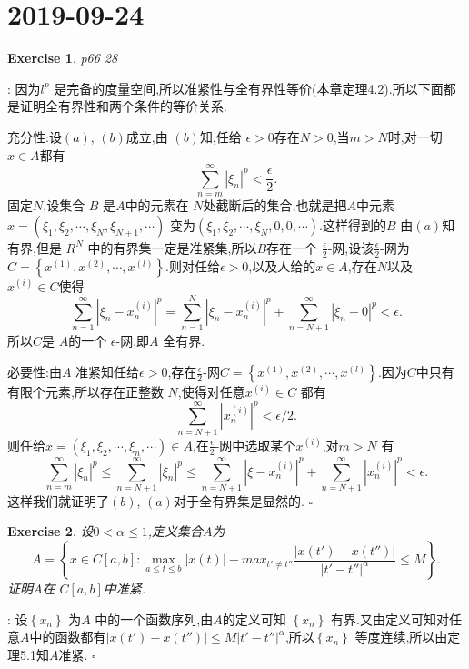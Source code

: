 \documentclass[a4paper]{article}
\newtheorem*{exe}{Exercise}
\newenvironment{sol}{{\noindent\bfseries Solution}:}{\hfill $\square$\par}
\begin{document}
\section{2019-09-24}
\begin{exe}
  p66 28	
\end{exe}
\begin{sol}
  因为$l^{p}$ 是完备的度量空间,所以准紧性与全有界性等价(本章定理4.2).所以下面都是证明全有界性和两个条件的等价关系.

  充分性:设$(a)$, $(b)$成立,由 $(b)$知,任给 $\epsilon >0$存在$N>0$,当$m>N$时,对一切 $x\in A$都有
  \[
    \sum_{n=m}^{\infty} \left| \xi_n \right|^{p} <\frac{\epsilon}{2} 
  .\]
  固定$N$,设集合 $B$ 是$A$中的元素在 $N$处截断后的集合,也就是把$A$中元素 $x=\left( \xi_1,\xi_2,\cdots,\xi_N,\xi_{N+1},\cdots \right) $ 变为$\left( \xi_1,\xi_2,\cdots,\xi_N,0,0,\cdots \right) $.这样得到的$B$ 由$(a)$知有界,但是 $R^{N}$ 中的有界集一定是准紧集,所以$B$存在一个 $\frac{\epsilon }{2}$-网,设该$\frac{\epsilon }{2}$-网为$C=\left\{ x^{(1)},x^{(2)},\cdots,x^{(l)} \right\} $.则对任给$\epsilon >0$,以及人给的$x\in A$,存在$N$以及 $x^{(i)}\in C$使得
  \[
  \sum_{n=1}^{\infty} \left| \xi_n-x^{(i)}_n \right| ^{p}=\sum_{n=1}^{N} \left| \xi_n-x^{(i)}_n \right| ^{p}+\sum_{n=N+1}^{\infty} \left| \xi_n -0\right|^{p}<\epsilon  
  .\]
  所以$C$是 $A$的一个 $\epsilon $-网,即$A$ 全有界.

  必要性:由$A$ 准紧知任给$\epsilon >0$,存在$\frac{\epsilon }{2} $-网$C=\left\{ x^{(1)},x^{(2)},\cdots,x^{(l)} \right\} $.因为$C$中只有有限个元素,所以存在正整数 $N$,使得对任意$x^{(i)}\in C$ 都有
  \[
  \sum_{n=N+1}^{\infty} \left| x_{n}^{(i)} \right| ^{p}<\epsilon /2
  .\] 
  则任给$x=\left( \xi_1,\xi_2,\cdots,\xi_n,\cdots \right)\in A $,在$\frac{\epsilon }{2}$-网中选取某个$x^{(i)}$,对$m>N$ 有
  \[
  \sum_{n=m}^{\infty} \left| \xi_n \right| ^{p}\le \sum_{n=N+1}^{\infty} \left| \xi_n \right| ^{p}\le \sum_{n=N+1}^{\infty} \left| \xi-x^{(i)}_n \right|^{p} +\sum_{n=N+1}^{\infty} \left| x^{(i)}_n \right|^{p} <\epsilon 
  .\]
  这样我们就证明了$(b)$, $(a)$对于全有界集是显然的.
\end{sol}
\begin{exe}
  设$0<\alpha\le 1$,定义集合$A$为
  \[
    A=\left\{ x\in C[a,b]:\max_{a\le t\le b}\left| x(t) \right| +max_{t'\neq t''}\frac{\left| x(t')-x(t'') \right| }{\left| t'-t'' \right| ^{\alpha}}\le M \right\} 
  .\]
  证明$A$在 $C[a,b]$中准紧.
\end{exe}
\begin{sol}
  设$\left\{ x_n \right\} $ 为$A$ 中的一个函数序列,由$A$的定义可知 $\left\{ x_n \right\} $ 有界.又由定义可知对任意$A$中的函数都有$\left| x(t')-x(t'') \right| \le M\left| t'-t'' \right| ^{\alpha}$,所以$\left\{ x_n \right\} $ 等度连续,所以由定理5.1知$A$准紧.
\end{sol}
\end{document}
